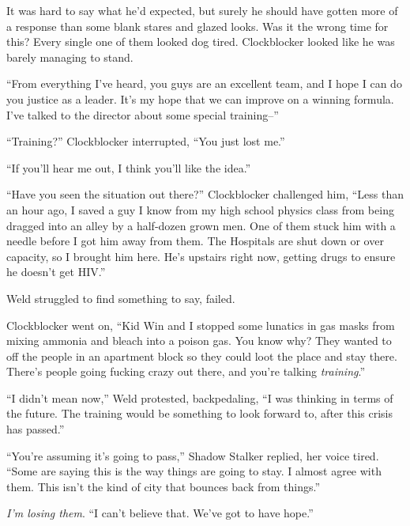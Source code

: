 It was hard to say what he'd expected, but surely he should have gotten more of a response than some blank stares and glazed looks.  Was it the wrong time for this?  Every single one of them looked dog tired.  Clockblocker looked like he was barely managing to stand.



``From everything I've heard, you guys are an excellent team, and I hope I can do you justice as a leader.  It's my hope that we can improve on a winning formula.  I've talked to the director about some special training--''



``Training?'' Clockblocker interrupted, ``You just lost me.''



``If you'll hear me out, I think you'll like the idea.''



``Have you seen the situation out there?'' Clockblocker challenged him, ``Less than an hour ago, I saved a guy I know from my high school physics class from being dragged into an alley by a half-dozen grown men.  One of them stuck him with a needle before I got him away from them.  The Hospitals are shut down or over capacity, so I brought him here.  He's upstairs right now, getting drugs to ensure he doesn't get HIV.''



Weld struggled to find something to say, failed.



Clockblocker went on, ``Kid Win and I stopped some lunatics in gas masks from mixing ammonia and bleach into a poison gas.  You know why?  They wanted to off the people in an apartment block so they could loot the place and stay there.  There's people going fucking crazy out there, and you're talking \emph{training}.''



``I didn't mean now,'' Weld protested, backpedaling, ``I was thinking in terms of the future.  The training would be something to look forward to, after this crisis has passed.''



``You're assuming it's going to pass,'' Shadow Stalker replied, her voice tired.  ``Some are saying this is the way things are going to stay.  I almost agree with them.  This isn't the kind of city that bounces back from things.''



\emph{I'm losing them}.  ``I can't believe that.  We've got to have hope.''



